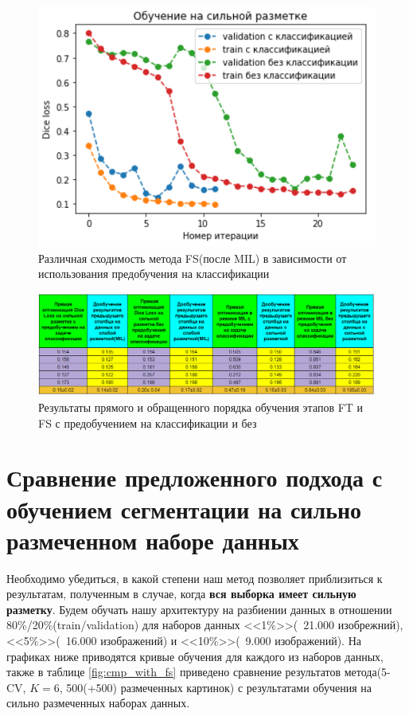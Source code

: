 \begin{figure}[h!] 
  \center
  \includegraphics [scale=0.7] {images/cmp_order_class.png}
  \caption{ Различная сходимость метода FS(после MIL) в зависимости от использования предобучения на классификации }
  \label{fig:cmp_order_class}  
\end{figure}


\begin{figure}[h!] 
  \center
  \includegraphics [scale=0.8] {images/total_table_results.png}
  \caption{ Результаты прямого и обращенного порядка обучения этапов FT и FS с предобучением на классификации и без}
  \label{fig:cmp_order_class}  
\end{figure}

\newpage
\section{Сравнение предложенного подхода с обучением сегментации на сильно размеченном наборе данных}

Необходимо убедиться, в какой степени наш метод позволяет приблизиться к результатам, полученным в случае, когда {\bf вся выборка имеет сильную разметку}. Будем обучать нашу архитектуру на разбиении данных в отношении 80\%/20\%(train/validation) для наборов данных <<1\%>>(~21.000 изобрежний), <<5\%>>(~16.000 изображений) и <<10\%>>(~9.000 изображений). На графиках ниже приводятся кривые обучения для каждого из наборов данных, также в таблице \ref{fig:cmp_with_fs} приведено сравнение результатов метода(5-CV, $K=6$, 500(+500) размеченных картинок) с результатами обучения на сильно размеченных наборах данных.

